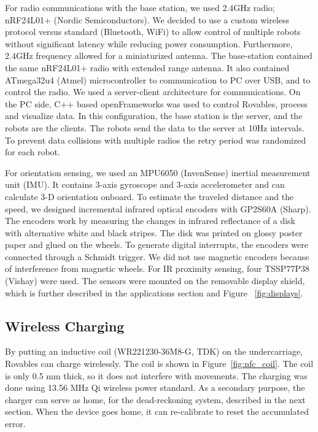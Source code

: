 For radio communications with the base station, we used 2.4GHz radio; nRF24L01+ (Nordic Semiconductors). We decided to use a custom wireless protocol versus standard (Bluetooth, WiFi) to allow control of multiple robots without significant latency while reducing power consumption. Furthermore, 2.4GHz frequency allowed for a miniaturized antenna. 
The base-station contained the same nRF24L01+ radio with extended range antenna. It also contained ATmega32u4 (Atmel) microcontroller to communication to PC over USB, and to control the radio. We used a server-client architecture for communications. On the PC side, C++ based openFrameworks was used to control Rovables, process and visualize data.  In this configuration, the base station is the server, and the robots are the clients. The robots send the data to the server at 10Hz intervals. To prevent data collisions with multiple radios the retry period was randomized for each robot. 

For orientation sensing, we used an MPU6050 (InvenSense) inertial measurement unit (IMU). It contains 3-axis gyroscope and 3-axis accelerometer and can calculate 3-D orientation onboard. To estimate the traveled distance and the speed, we designed incremental infrared optical encoders with GP2S60A (Sharp). The encoders work by measuring the changes in infrared reflectance of a disk with alternative white and black stripes. The disk was printed on glossy poster paper and glued on the wheels. To generate digital interrupts, the encoders were connected through a Schmidt trigger. We did not use magnetic encoders because of interference from magnetic wheels. For IR proximity sensing, four TSSP77P38 (Vishay) were used. The sensors were mounted on the removable display shield, which is further described in the applications section and Figure ~\ref{fig:displays}.

\subsection{Wireless Charging}
By putting an inductive coil (WR221230-36M8-G, TDK) on the undercarriage, Rovables can charge wirelessly. The coil is shown in Figure~\ref{fig:nfc_coil}. The coil is only 0.5 mm thick, so it does not interfere with movements. The charging was done using 13.56 MHz Qi wireless power standard. As a secondary purpose, the charger can serve as home, for the dead-reckoning system, described in the next section. When the device goes home, it can re-calibrate to reset the accumulated error. 

